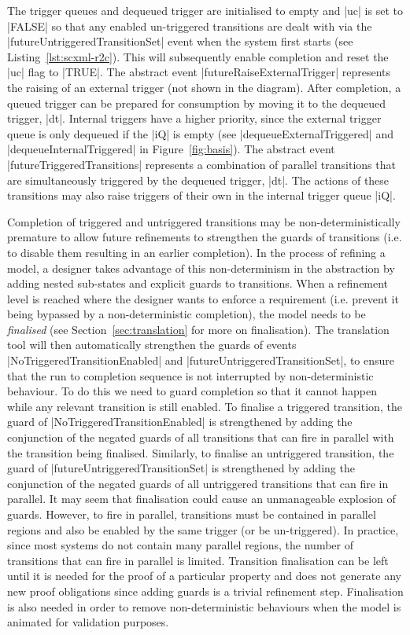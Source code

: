 The trigger queues and dequeued trigger are initialised to empty and |uc| is set to |FALSE| so that any enabled un-triggered transitions are dealt with via the |futureUntriggeredTransitionSet| event when the system first starts (see Listing~\ref{lst:scxml-r2c}).
This will subsequently enable completion and reset the |uc| flag to |TRUE|.
The abstract event |futureRaiseExternalTrigger| represents the raising  of an external trigger (not shown in the diagram).    
After completion, a queued trigger can be prepared for consumption by moving it to the dequeued trigger, |dt|.
Internal triggers have a higher priority, since the external trigger queue is only dequeued if the |iQ| is empty (see |dequeueExternalTriggered| and |dequeueInternalTriggered| in Figure~\ref{fig:basis}).
The abstract event |futureTriggeredTransitions| represents a combination of parallel transitions that are simultaneously triggered by the dequeued trigger, |dt|.
The actions of these transitions may also raise triggers of their own in the internal trigger queue |iQ|.


Completion of triggered and untriggered transitions may be non-deterministically premature to allow future refinements to strengthen the guards of transitions (i.e. to disable them resulting in an earlier completion).
In the process of refining a model, a designer takes advantage of this non-determinism in the abstraction by adding nested sub-states and explicit guards to transitions. 
When a refinement level is reached where the designer wants to enforce a requirement (i.e. prevent it being bypassed by a non-deterministic completion), the model needs to be \emph{finalised} (see Section~\ref{sec:translation} for more on finalisation). 
The \SCXML translation tool will then automatically strengthen the guards of events |NoTriggeredTransitionEnabled| and |futureUntriggeredTransitionSet|, to ensure that the run to completion sequence is not interrupted by non-deterministic behaviour. 
To do this we need to guard completion so that it cannot happen while any relevant transition is still enabled.
To finalise a triggered transition, the guard of |NoTriggeredTransitionEnabled| is strengthened by adding the conjunction of the negated guards of all transitions that can fire in parallel with the transition being finalised.
Similarly, to finalise an untriggered transition, the guard of |futureUntriggeredTransitionSet| is strengthened by adding the conjunction of the negated guards of all untriggered transitions that can fire in parallel.
It may seem that finalisation could cause an unmanageable explosion of guards.
However, to fire in parallel, transitions must be contained in parallel regions and also be enabled by the same trigger (or be un-triggered).
In practice, since most systems do not contain many parallel regions, the number of transitions that can fire in parallel is limited.
Transition finalisation can be left until it is needed for the proof of a particular property and does not generate any new proof obligations since adding guards is a trivial refinement step.
Finalisation is also needed in order to remove non-deterministic behaviours when the model is animated for validation purposes.

